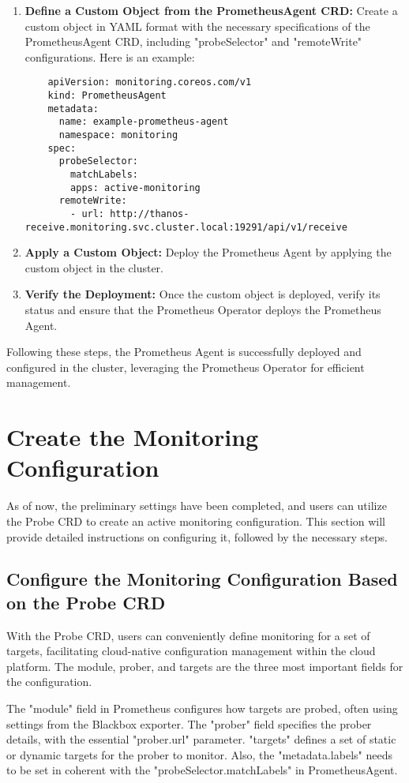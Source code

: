 \begin{enumerate}
\item \textbf{Define a Custom Object from the PrometheusAgent \ac{CRD}:}
Create a custom object in YAML format with the necessary specifications of the PrometheusAgent \ac{CRD}, including "probeSelector" and "remoteWrite" configurations. Here is an example:
\begin{lstlisting}
    apiVersion: monitoring.coreos.com/v1
    kind: PrometheusAgent
    metadata:
      name: example-prometheus-agent
      namespace: monitoring
    spec:
      probeSelector:
        matchLabels:
        apps: active-monitoring
      remoteWrite:
        - url: http://thanos-receive.monitoring.svc.cluster.local:19291/api/v1/receive
\end{lstlisting}
\item \textbf{Apply a Custom Object:}
Deploy the Prometheus Agent by applying the custom object in the cluster. 
\item \textbf{Verify the Deployment:}
Once the custom object is deployed, verify its status and ensure that the Prometheus Operator deploys the Prometheus Agent. 
\end{enumerate}

Following these steps, the Prometheus Agent is successfully deployed and configured in the cluster, leveraging the Prometheus Operator for efficient management. 

\section{Create the Monitoring Configuration}

As of now, the preliminary settings have been completed, and users can utilize the Probe \ac{CRD} to create an active monitoring configuration. This section will provide detailed instructions on configuring it, followed by the necessary steps. 

\subsection{Configure the Monitoring Configuration Based on the Probe \ac{CRD}}

With the Probe \ac{CRD}, users can conveniently define monitoring for a set of targets, facilitating cloud-native configuration management within the cloud platform. The module, prober, and targets are the three most important fields for the configuration. 

The "module" field in Prometheus configures how targets are probed, often using settings from the Blackbox exporter. The "prober" field specifies the prober details, with the essential "prober.url" parameter. "targets" defines a set of static or dynamic targets for the prober to monitor. Also, the "metadata.labels" needs to be set in coherent with the "probeSelector.matchLabels" in PrometheusAgent. 

